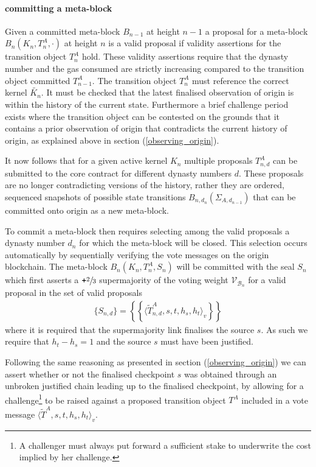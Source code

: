 \documentclass[12pt,a4paper]{article}
\begin{document}
\paragraph{committing a meta-block} Given a committed meta-block $B_{n-1}$ at height $n-1$ a proposal for a meta-block $B_{n}(K_{n}, T^A_{n}, \cdot)$ at height $n$ is a valid proposal if validity assertions for the transition object $T^A_n$ hold.  These validity assertions require that the dynasty number and the gas consumed are strictly increasing compared to the transition object committed $T^A_{n-1}$. The transition object $T^A_n$ must reference the correct kernel $\tilde{K_n}$. It must be checked that the latest finalised observation of origin is within the history of the current state. Furthermore  a brief challenge period exists where the transition object can be contested on the grounds that it contains a prior observation of origin that contradicts the current history of origin, as explained above in section (\ref{observing_origin}).

It now follows that for a given active kernel $K_n$ multiple proposals $T^{A}_{n,d}$ can be submitted to the core contract for different dynasty numbers $d$.  These proposals are no longer contradicting versions of the history, rather they are ordered, sequenced snapshots of possible state transitions $B_{n,d_{n}}(\Sigma_{A,d_{n-1}})$ that can be committed onto origin as a new meta-block.

To commit a meta-block then requires selecting among the valid proposals a dynasty number $d_n$ for which the meta-block will be closed. This selection occurs automatically by sequentially verifying the vote messages on the origin blockchain.
The meta-block $B_n(K_n, T^A_n, S_n)$ will be committed with the seal $S_n$ which first asserts a $\texttt{+}\sfrac{2}{3}$ supermajority of the voting weight $\mathcal{V}_{\mathcal{B}_n}$ for a valid proposal in the set of valid proposals
\begin{align*}
  \{S_{n,d}\} = \left\{\left\{\langle\tilde{T}^A_{n,d}, s, t, h_s, h_t\rangle_v\right\}\right\}
\end{align*}
where it is required that the supermajority link finalises the source $s$.
As such we require that $h_t - h_s = 1$ and the source $s$ must have been justified.

Following the same reasoning as presented in section (\ref{observing_origin}) we can assert whether or not the finalised checkpoint $s$ was obtained through an unbroken justified chain leading up to the finalised checkpoint, by allowing for a challenge\footnote{A challenger must always put forward a sufficient stake to underwrite the cost implied by her challenge.} to be raised against a proposed transition object $T^A$ included in a vote message $\langle\tilde{T}^A, s, t, h_s, h_t\rangle_v$.
\end{document}
